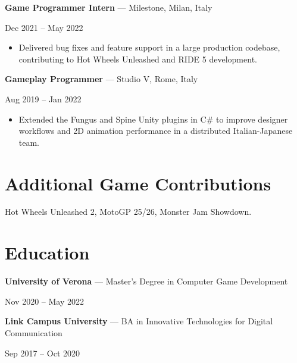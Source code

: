 \documentclass[10pt,a4paper]{article}
\newcommand{\role}[3]{
    \needspace{4\baselineskip}
    \textbf{#1} --- #2\par
    {\small #3}\par
}
\begin{document}
\vspace{3pt}

\role{Game Programmer Intern}
     {Milestone, Milan, Italy}
     {Dec 2021 -- May 2022}

\begin{itemize}
    \item Delivered bug fixes and feature support in a large
    production codebase, contributing to Hot Wheels Unleashed
    and RIDE 5 development.
\end{itemize}

\vspace{3pt}

\role{Gameplay Programmer}
     {Studio V, Rome, Italy}
     {Aug 2019 -- Jan 2022}

\begin{itemize}
    \item Extended the Fungus and Spine Unity plugins in C\#
    to improve designer workflows and 2D animation performance
    in a distributed Italian-Japanese team.
\end{itemize}

\section{Additional Game Contributions}

Hot Wheels Unleashed 2, MotoGP 25/26, Monster Jam Showdown.

\section{Education}

\textbf{University of Verona}
--- Master's Degree in Computer Game Development\par
{\small Nov 2020 -- May 2022}\par

\vspace{3pt}

\textbf{Link Campus University}
--- BA in Innovative Technologies for Digital Communication\par
{\small Sep 2017 -- Oct 2020}\par
\end{document}
